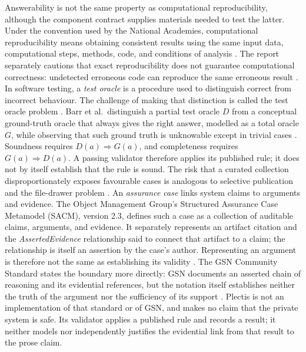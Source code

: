\documentclass[11pt]{article}
\begin{document}
Answerability is not the same property as computational reproducibility,
although the component contract supplies materials needed to test the
latter. Under the convention used by the National Academies, computational
reproducibility means obtaining consistent results using the same input
data, computational steps, methods, code, and conditions of analysis
\cite[conclusion 3-1]{nasem2019}. The report separately cautions that exact
reproducibility does not guarantee computational correctness: undetected
erroneous code can reproduce the same erroneous result
\cite[p.~9]{nasem2019}.
In software testing, a \emph{test oracle} is a procedure used to distinguish
correct from incorrect behaviour. The challenge of making that distinction is
called the test oracle problem \cite[p.~507]{barr2015}. Barr et al.\ distinguish
a partial test oracle \(D\) from a conceptual ground-truth oracle that always
gives the right answer, modelled as a total oracle \(G\), while observing that
such ground truth is unknowable except in trivial cases
\cite[Defs.~2.4 and 2.6--2.8, pp.~509--510]{barr2015}. Soundness requires
\(D(a)\Rightarrow G(a)\), and completeness requires
\(G(a)\Rightarrow D(a)\). A passing validator therefore applies its published
rule; it does not by itself establish that the rule is sound. The risk
that a curated collection disproportionately exposes favourable cases is
analogous to selective publication and the file-drawer problem
\cite[p.~638]{rosenthal1979}.
An \emph{assurance case} links system claims to arguments and evidence. The
Object Management Group's Structured Assurance Case Metamodel (SACM), version
2.3, defines such a case as a collection of auditable claims, arguments, and
evidence. It separately represents an artifact citation and the
\emph{AssertedEvidence} relationship said to connect that artifact to a claim;
the relationship is itself an assertion by the case's author. Representing an
argument is therefore not the same as establishing its validity
\cite[secs. 1.1, 4, 7.3, 11.9--11.15]{omgsacm2023}. The GSN Community Standard
states the boundary more directly: GSN documents an asserted chain of
reasoning and its evidential references, but the notation itself establishes
neither the truth of the argument nor the sufficiency of its support
\cite[\S0:3.2, p.~11; \S\S0:4.11--0:4.13, p.~15]{gsn}. Plectis is not an
implementation of that standard or of GSN, and makes no claim that the private
system is safe. Its validator applies a published rule and records a result;
it neither models nor independently justifies the evidential link from that
result to the prose claim.
\end{document}
